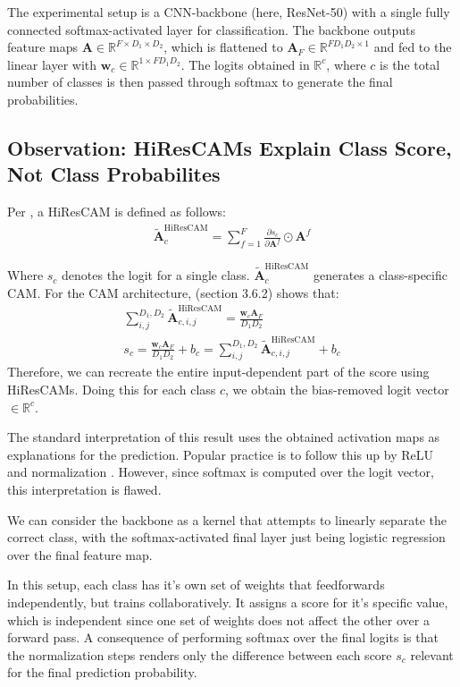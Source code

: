 \documentclass{article}
\begin{document}
The experimental setup is a CNN-backbone (here, ResNet-50) with a single fully connected softmax-activated layer for classification. The backbone outputs feature maps $\bm{A} \in \mathbb{R}^{F \times D_1 \times D_2}$, which is flattened to $\bm{A}_F \in \mathbb{R}^{FD_1D_2 \times 1}$ and fed to the linear layer with $\bm{w}_c \in \mathbb{R}^{1 \times FD_1D_2}$. The logits obtained in $\mathbb{R}^{c}$, where $c$ is the total number of classes is then passed through softmax to generate the final probabilities.

\subsection{Observation: HiResCAMs Explain Class Score, Not Class Probabilites}

Per \cite{draelos2020use}, a HiResCAM is defined as follows:
\begin{gather}
	\tilde{\mathcal{\bm{A}}}_c^{\text{HiResCAM}} = \sum^F_{f=1} \frac{\partial s_c}{\partial \bm{A}^f} \odot \bm{A}^f
\end{gather}

Where $s_c$ denotes the logit for a single class. $\tilde{\mathcal{\bm{A}}}_c^{\text{HiResCAM}}$ generates a class-specific CAM. For the CAM architecture, \cite{draelos2020use} (section 3.6.2) shows that:
\begin{gather}
	\sum^{D_1,D_2}_{i,j} \tilde{\mathcal{\bm{A}}}_{c,i,j}^{\text{HiResCAM}} = \frac{\bm{w}_c \bm{A}_F}{D_1 D_2} \\
	s_c = \frac{\bm{w}_c \bm{A}_F}{D_1 D_2} + b_c = \sum^{D_1,D_2}_{i,j} \tilde{\mathcal{\bm{A}}}_{c,i,j}^{\text{HiResCAM}} + b_c
\end{gather}
Therefore, we can recreate the entire input-dependent part of the score using HiResCAMs. Doing this for each class $c$, we obtain the bias-removed logit vector $\in \mathbb{R}^{c}$.

The standard interpretation of this result uses the obtained activation maps as explanations for the prediction. Popular practice is to follow this up by ReLU and normalization \citep{draelos2020use}. However, since softmax is computed over the logit vector, this interpretation is flawed.

We can consider the backbone as a kernel that attempts to linearly separate the correct class, with the softmax-activated final layer just being logistic regression over the final feature map.

In this setup, each class has it's own set of weights that feedforwards independently, but trains collaboratively. It assigns a score for it's specific value, which is independent since one set of weights does not affect the other over a forward pass. A consequence of performing softmax over the final logits is that the normalization steps renders only the difference between each score $s_c$ relevant for the final prediction probability.
\end{document}
